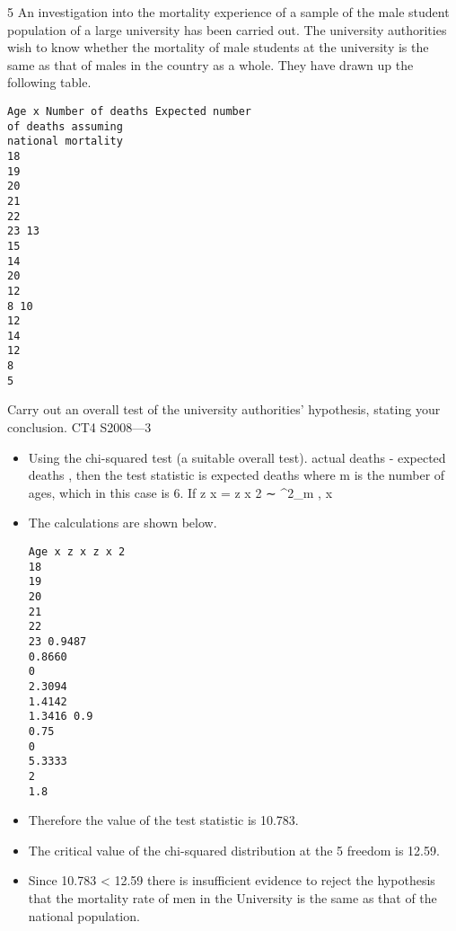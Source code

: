 \documentclass[a4paper,12pt]{article}
\begin{document}
5
An investigation into the mortality experience of a sample of the male student population of a large university has been carried out. The university authorities wish to know whether the mortality of male students at the university is the same as that of
males in the country as a whole. They have drawn up the following table.
\begin{verbatim}
Age x Number of deaths Expected number
of deaths assuming
national mortality
18
19
20
21
22
23 13
15
14
20
12
8 10
12
14
12
8
5
\end{verbatim}
Carry out an overall test of the university authorities’ hypothesis, stating your
conclusion.
CT4 S2008—3

\newpage
\begin{itemize}
\item Using the chi-squared test (a suitable overall test).
actual deaths - expected deaths
, then the test statistic is
expected deaths
where m is the number of ages, which in this case is 6.
If z x =
\sum z x 2 ∼ \chi^2_m ,
x
\item The calculations are shown below.
\begin{verbatim}
Age x z x z x 2
18
19
20
21
22
23 0.9487
0.8660
0
2.3094
1.4142
1.3416 0.9
0.75
0
5.3333
2
1.8
\end{verbatim}
\item 
Therefore the value of the test statistic is 10.783.
\item The critical value of the chi-squared distribution
at the 5%
freedom is 12.59.
\item Since 10.783 < 12.59 there is insufficient evidence to reject
the hypothesis that the mortality rate of men in the University is the same as that of
the national population.
\end{itemize}
\end{document}
